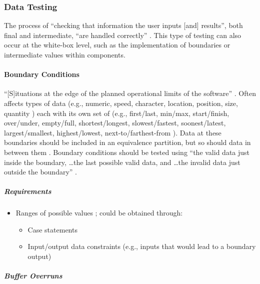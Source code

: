 \subsubsection{Data Testing \cite[p.~70-79]{patton_software_2006}}

The process of ``checking that information the user inputs [and] results'',
both final and intermediate, ``are handled correctly''
\cite[p.~70]{patton_software_2006}. This type of testing can also occur at the
white-box level, such as the implementation of boundaries
\cite[p.~431]{van_vliet_software_2000} or intermediate values within
components.

\paragraph{Boundary Conditions \cite[p.~70-74]{patton_software_2006}}

``[S]ituations at the edge of the planned operational limits of the software''
\cite[p.~72]{patton_software_2006}. Often affects types of data (e.g., numeric,
speed, character, location, position, size, quantity
\cite[p.~72]{patton_software_2006}) each with its own set of (e.g., first/last,
min/max, start/finish, over/under, empty/full, shortest/longest,
slowest/fastest, soonest/latest, largest/smallest, highest/lowest,
next-to/farthest-from \cite[p.~72-73]{patton_software_2006}). Data at these
boundaries should be included in an equivalence partition, but so should
data in between them \cite[p.~73]{patton_software_2006}. Boundary conditions
should be tested using ``the valid data just inside the boundary,
\dots the last possible valid data, and \dots the invalid data just outside the
boundary'' \cite[p.~73]{patton_software_2006}.

\subparagraph{Requirements}
\begin{itemize}
      \item Ranges of possible values \cite[p.~67, 73]{patton_software_2006};
            could be obtained through:
            \begin{itemize}
                  \item Case statements
                  \item Input/output data constraints (e.g., inputs that
                        would lead to a boundary output)
            \end{itemize}
\end{itemize}

\subparagraph{Buffer Overruns \cite[p.~201-205]{patton_software_2006}}

